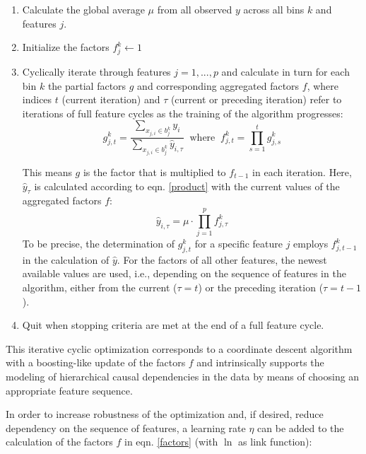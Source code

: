 \documentclass[BCOR=1mm, DIV=calc,10pt,
twoside=true,
twocolumn,
headings=normal]{scrartcl}
\begin{document}
\begin{enumerate}
\item{Calculate the global average $\mu$ from all observed $y$ across all bins $k$ and
features $j$.}
\item{Initialize the factors $f^k_j \leftarrow 1$}
\item{Cyclically iterate through features $j = 1,...,p $ and calculate in turn for each
bin $k$ the partial factors $g$ and corresponding aggregated factors $f$, where indices
$t$ (current iteration) and $\tau$ (current or preceding iteration) refer to iterations of
full feature cycles as the training of the algorithm progresses:
\begin{equation} \label{factors}
g^k_{j,t} = \frac{\sum \limits_{x_{j,i} \in b^k_j} y_i}{\sum \limits_{x_{j,i} \in b^k_j} \hat{y}_{i,\tau}}
\;\; \mathrm{where} \; \; f^k_{j,t} = \prod \limits_{s=1}^t g^k_{j,s}
\end{equation}

\noindent
This means $g$ is the factor that is multiplied to $f_{t-1}$ in each iteration. Here,
$\hat{y}_\tau$ is calculated according to eqn. \ref{product} with the current values of
the aggregated factors $f$:
\begin{equation} \label{factors3}
\hat{y}_{i,\tau} = \mu \cdot \prod \limits_{j=1}^p f^k_{j,\tau}
\end{equation}
\noindent
To be precise, the determination of $g^k_{j,t}$ for a specific feature $j$ employs
$f^k_{j,t-1}$ in the calculation of $\hat{y}$. For the factors of all other features, the
newest available values are used, i.e., depending on the sequence of features in the
algorithm, either from the current ($\tau=t$) or the preceding iteration ($\tau=t-1$).
}
\item{Quit when stopping criteria are met at the end of a full feature cycle.}
\end{enumerate}

\noindent
This iterative cyclic optimization corresponds to a coordinate descent algorithm
\cite{Wright2015} with a boosting-like update of the factors $f$ and intrinsically
supports the modeling of hierarchical causal dependencies in the data by means of choosing
an appropriate feature sequence.

In order to increase robustness of the optimization and, if desired, reduce dependency on
the sequence of features, a learning rate $\eta$ can be added to the calculation of the
factors $f$ in eqn. \ref{factors} (with $\ln$ as link function):
\end{document}
